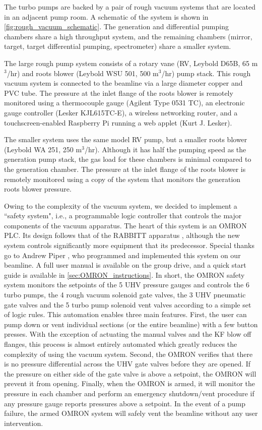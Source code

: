 The turbo pumps are backed by a pair of rough vacuum systems that are located in an adjacent pump room. A schematic of the system is shown in \cref{fig:rough_vacuum_schematic}. The generation and differential pumping chambers share a high throughput system, and the remaining chambers (mirror, target, target differential pumping, spectrometer) share a smaller system.

The large rough pump system consists of a rotary vane (RV, Leybold D65B, 65 m$^3$/hr) and roots blower (Leybold WSU 501, 500 m$^3$/hr) pump stack. This rough vacuum system is connected to the beamline via a large diameter copper and PVC tube. The pressure at the inlet flange of the roots blower is remotely monitored using a thermocouple gauge (Agilent Type 0531 TC), an electronic gauge controller (Lesker KJL615TC-E), a wireless networking router, and a touchscreen-enabled Raspberry Pi running a web applet (Kurt J. Lesker).

The smaller system uses the same model RV pump, but a smaller roots blower (Leybold WA 251, 250 m$^3$/hr). Although it has half the pumping speed as the generation pump stack, the gas load for these chambers is minimal compared to the generation chamber. The pressure at the inlet flange of the roots blower is remotely monitored using a copy of the system that monitors the generation roots blower pressure.

Owing to the complexity of the vacuum system, we decided to implement a ``safety system", i.e., a programmable logic controller that controls the major components of the vacuum apparatus. The heart of this system is an OMRON PLC. Its design follows that of the RABBITT apparatus \cite{chirlaAttosecondPulseGeneration2011}, although the new system controls significantly more equipment that its predecessor. Special thanks go to Andrew Piper \cite{piperAndrewPiperDissertation2022}, who programmed and implemented this system on our beamline. A full user manual is available on the group drive, and a quick start guide is available in \cref{sec:OMRON_instructions}. In short, the OMRON safety system monitors the setpoints of the 5 UHV pressure gauges and controls the 6 turbo pumps, the 4 rough vacuum solenoid gate valves, the 3 UHV pneumatic gate valves and the 5 turbo pump solenoid vent valves according to a simple set of logic rules. This automation enables three main features. First, the user can pump down or vent individual sections (or the entire beamline) with a few button presses. With the exception of actuating the manual valves and the KF blow off flanges, this process is almost entirely automated which greatly reduces the complexity of using the vacuum system. Second, the OMRON verifies that there is no pressure differential across the UHV gate valves before they are opened. If the pressure on either side of the gate valve is above a setpoint, the OMRON will prevent it from opening. Finally, when the OMRON is armed, it will monitor the pressure in each chamber and perform an emergency shutdown/vent procedure if any pressure gauge reports pressures above a setpoint. In the event of a pump failure, the armed OMRON system will safely vent the beamline without any user intervention.

